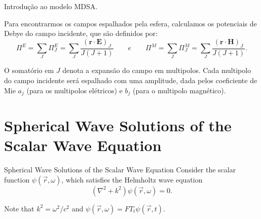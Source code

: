 \documentclass[10pt]{beamer}
\begin{document}
\begin{frame}[fragile]{Introdução ao modelo MDSA.}

    \begin{center}
        Para encontrarmos os campos espalhados pela esfera, calculamos os potenciais de Debye do campo incidente, que são definidos por:
        \begin{equation}
        \Pi^{E}=\sum\limits_{J} \Pi^{E}_J=\sum\limits_{J}\frac{ ({\mathbf r}\cdot{\mathbf E })_J }{J(J+1)} \qquad e\qquad \Pi^{M}=\sum\limits_{J} \Pi^{M}_J=\sum\limits_{J}\frac{ ({\mathbf r}\cdot{\mathbf H })_J }{J(J+1)} .
        \end{equation}

        O somatório em $J$ denota a expansão do campo em multipolos. Cada multipolo do campo incidente será espalhado com uma amplitude, dada pelos coeficiente de Mie $a_j$ (para os multipolos elétricos) e $b_j$ (para o multipolo magnético).


    \end{center}

\end{frame}


\section{Spherical Wave Solutions of the Scalar Wave Equation}


\begin{frame}[fragile]{Spherical Wave Solutions of the Scalar Wave Equation}
    Consider the scalar function $\psi(\vec{r},\omega)$, which satisfies the Helmholtz wave equation\\
      \begin{equation*}
        \left(\nabla^2 + k^2\right)\psi(\vec{r},\omega) = 0 .
      \end{equation*}

    Note that $k^2=\omega^2/c^2$ and $\psi(\vec{r},\omega)=FT_t{\psi(\vec{r},t)}$.

\end{frame}

\end{document}
